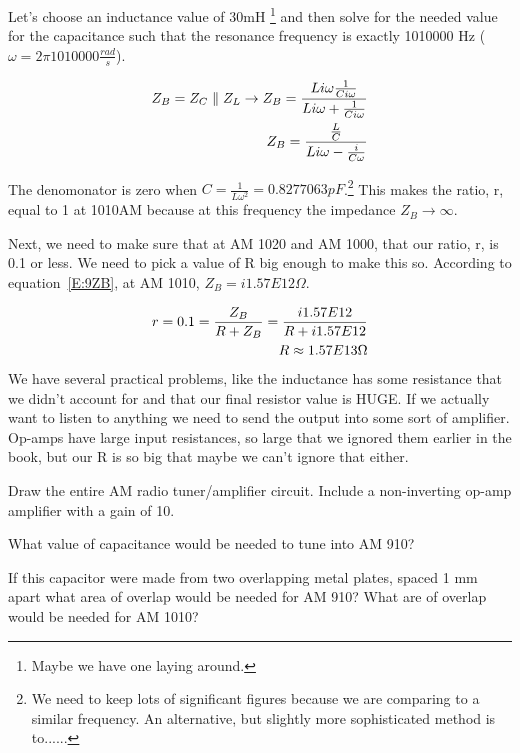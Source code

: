 Let's choose an inductance value of 30mH \footnote{Maybe we have one laying around.} and then solve for the needed value for the capacitance such that the resonance frequency is exactly 1010000 Hz ($\omega=2\pi 1010000 \frac{rad}{s}$).

\begin{align}
Z_B=Z_C \parallel Z_L \rightarrow Z_B=\frac{Li\omega\frac{1}{Ci\omega}}{Li\omega+\frac{1}{Ci\omega}} \notag \\
Z_B=\frac{\frac{L}{C}}{Li\omega-\frac{i}{C\omega}} \label{E:9ZB}
\end{align}

The denomonator is zero when $C=\frac{1}{L\omega^2}=0.8277063pF$.\footnote{We need to keep lots of significant figures because we are comparing to a similar frequency. An alternative, but slightly more sophisticated method is to......} This makes the ratio, r, equal to 1 at 1010AM because at this frequency the impedance $Z_B \rightarrow \infty$.\par

Next, we need to make sure that at AM 1020 and AM 1000, that our ratio, r, is 0.1 or less. We need to pick a value of R big enough to make this so. According to equation~\eqref{E:9ZB}, at AM 1010, $Z_B=i1.57E12\Omega$.

\begin{align}
r=0.1 = \frac{Z_B}{R+Z_B}=\frac{i1.57E12}{R+i1.57E12}\notag \\
R \approx 1.57E13 \Omega
\end{align}
 We have several practical problems, like the inductance has some resistance that we didn't account for and that our final resistor value is HUGE. If we actually want to listen to anything we need to send the output into some sort of amplifier. Op-amps have large input resistances, so large that we ignored them earlier in the book, but our R is so big that maybe we can't ignore that either.

\begin{clevel}
Draw the entire AM radio tuner/amplifier circuit. Include a non-inverting op-amp amplifier with a gain of 10.
\end{clevel}

\begin{clevel}
What value of capacitance would be needed to tune into AM 910?
\end{clevel}

\begin{clevel}
If this capacitor were made from two overlapping metal plates, spaced 1 mm apart what area of overlap would be needed for AM 910? What are of overlap would be needed for AM 1010?
\end{clevel}
